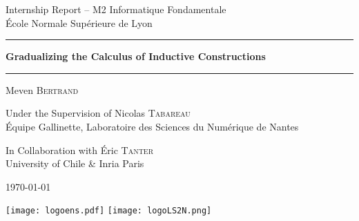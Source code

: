 \documentclass[en]{myarticle}
\date{\today}
\DeclareMathOperator{\?}{?}
\begin{document}
{
\thispagestyle{empty}
\raggedright
	
	{\Large Internship Report – M2 Informatique Fondamentale \\
	École Normale Supérieure de Lyon}
	
	
	{\rule{\linewidth}{0.5mm}
		\Huge\bfseries Gradualizing the Calculus of Inductive Constructions\\
	\rule{\linewidth}{0.5mm}
		\par}
	
	
	{\LARGE Meven \textsc{Bertrand}}
	
	
	{\Large Under the Supervision of Nicolas \textsc{Tabareau}}\\
	{\large Équipe Gallinette, Laboratoire des Sciences du Numérique de Nantes}
	
	
	{\Large In Collaboration with Éric \textsc{Tanter}}\\
	{\large University of Chile \& Inria Paris}
	
	
	{\Large\today}
	
	
	 \texttt{[image: logoens.pdf]}  \texttt{[image: logoLS2N.png]} 
	
	

}
\clearpage
\end{document}
